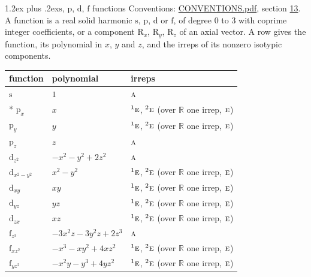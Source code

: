 \documentclass[10pt,a4paper]{article}
\makeatletter
\renewcommand\section{\@startsection{section}{1}{\z@}{-3ex plus -1ex minus -.2ex}%
  {1.2ex plus .2ex}{\normalfont\large\sffamily\bfseries\color{parttitle}}}
\numberwithin{equation}{section}
\newcommand{\irr}[1]{\text{\normalfont\scshape #1}}
\newcommand{\conjpair}[1]{{}^{#1}}
\newcommand{\orbital}[1]{\mathrm{#1}}
\makeatother
\begin{document}
\section{\texorpdfstring{$\orbital{s}$, $\orbital{p}$, $\orbital{d}$, $\orbital{f}$}{s, p, d, f} functions}\label{s:orbitals}
Conventions: \href{../../CONVENTIONS.pdf}{CONVENTIONS.pdf}, section \href{../../CONVENTIONS.pdf\#conv.13}{13}.
\leavevmode\label{n:head.function}A function is a real solid harmonic $\orbital{s}$, $\orbital{p}$, $\orbital{d}$ or $\orbital{f}$, of degree 0 to 3 with coprime integer coefficients, or a component $\orbital{R}_{x}$, $\orbital{R}_{y}$, $\orbital{R}_{z}$ of an axial vector. \label{n:head.polynomial}\label{n:head.irreps}A row gives the function, its polynomial in $x$, $y$ and $z$, and the irreps of its nonzero isotypic components.
{\small\begin{longtable}{@{}lll@{}}\toprule
function & polynomial & irreps\\\midrule\endhead
\bottomrule\endfoot\endlastfoot
$\orbital{s}$ & $1$ & $\irr{a}$\\*
$\orbital{p}_{x}$ & $x$ & $\conjpair{1}\irr{e}$, $\conjpair{2}\irr{e}$ (over $\mathbb{R}$ one irrep, $\irr{e}$)\\
$\orbital{p}_{y}$ & $y$ & $\conjpair{1}\irr{e}$, $\conjpair{2}\irr{e}$ (over $\mathbb{R}$ one irrep, $\irr{e}$)\\
$\orbital{p}_{z}$ & $z$ & $\irr{a}$\\
$\orbital{d}_{z^2}$ & $-x^{2} - y^{2} + 2z^{2}$ & $\irr{a}$\\
$\orbital{d}_{x^2-y^2}$ & $x^{2} - y^{2}$ & $\conjpair{1}\irr{e}$, $\conjpair{2}\irr{e}$ (over $\mathbb{R}$ one irrep, $\irr{e}$)\\
$\orbital{d}_{xy}$ & $xy$ & $\conjpair{1}\irr{e}$, $\conjpair{2}\irr{e}$ (over $\mathbb{R}$ one irrep, $\irr{e}$)\\
$\orbital{d}_{yz}$ & $yz$ & $\conjpair{1}\irr{e}$, $\conjpair{2}\irr{e}$ (over $\mathbb{R}$ one irrep, $\irr{e}$)\\
$\orbital{d}_{zx}$ & $xz$ & $\conjpair{1}\irr{e}$, $\conjpair{2}\irr{e}$ (over $\mathbb{R}$ one irrep, $\irr{e}$)\\
$\orbital{f}_{z^3}$ & $-3x^{2}z - 3y^{2}z + 2z^{3}$ & $\irr{a}$\\
$\orbital{f}_{xz^2}$ & $-x^{3} - xy^{2} + 4xz^{2}$ & $\conjpair{1}\irr{e}$, $\conjpair{2}\irr{e}$ (over $\mathbb{R}$ one irrep, $\irr{e}$)\\
$\orbital{f}_{yz^2}$ & $-x^{2}y - y^{3} + 4yz^{2}$ & $\conjpair{1}\irr{e}$, $\conjpair{2}\irr{e}$ (over $\mathbb{R}$ one irrep, $\irr{e}$)\\

\end{longtable}}
\end{document}
